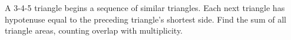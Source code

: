 A 3-4-5 triangle begins a sequence of similar triangles. Each next triangle has hypotenuse equal to the preceding triangle's shortest side. Find the sum of all triangle areas, counting overlap with multiplicity.
